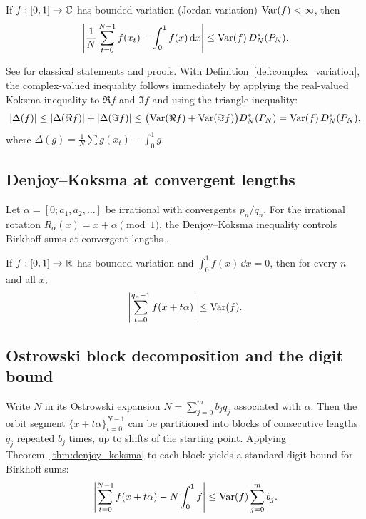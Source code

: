 \begin{theorem}
\label{thm:koksma_inequality_1d}
If $f:[0,1]\to\mathbb{C}$ has bounded variation (Jordan variation) $\mathrm{Var}(f)<\infty$, then
\begin{equation}
\left|\frac{1}{N}\sum_{t=0}^{N-1} f(x_t)-\int_0^1 f(x)\,\mathrm{d} x\right|
\le \mathrm{Var}(f)\,D_N^\ast(P_N).
\end{equation}
\end{theorem}
\begin{remark}
See \cite{Koksma1935,KuipersNiederreiter1974} for classical statements and proofs.
With Definition~\ref{def:complex_variation}, the complex-valued inequality follows immediately by applying the real-valued Koksma inequality to $\Re f$ and $\Im f$ and using the triangle inequality:
\begin{equation}
\left|\Delta(f)\right|
\le \left|\Delta(\Re f)\right|+\left|\Delta(\Im f)\right|
\le \big(\mathrm{Var}(\Re f)+\mathrm{Var}(\Im f)\big)D_N^\ast(P_N)
=\mathrm{Var}(f)\,D_N^\ast(P_N),
\end{equation}
where $\Delta(g)=\frac{1}{N}\sum g(x_t)-\int_0^1 g$.
\end{remark}

\subsection{Denjoy--Koksma at convergent lengths}
\label{app:denjoy_koksma}

Let $\alpha=[0;a_1,a_2,\dots]$ be irrational with convergents $p_n/q_n$. For the irrational rotation $R_\alpha(x)=x+\alpha\pmod 1$, the Denjoy--Koksma inequality controls Birkhoff sums at convergent lengths \cite{Denjoy1932,Koksma1935,KatokHasselblatt1995}.

\begin{theorem}
\label{thm:denjoy_koksma}
If $f:[0,1]\to\mathbb{R}$ has bounded variation and $\int_0^1 f(x)\,\dd x=0$, then for every $n$ and all $x$,
\begin{equation}
\left|\sum_{t=0}^{q_n-1} f(x+t\alpha)\right|\le \mathrm{Var}(f).
\end{equation}
\end{theorem}

\subsection{Ostrowski block decomposition and the digit bound}
\label{app:dk_koksma_ostrowski}

Write $N$ in its Ostrowski expansion $N=\sum_{j=0}^m b_j q_j$ associated with $\alpha$. Then the orbit segment $\{x+t\alpha\}_{t=0}^{N-1}$ can be partitioned into blocks of consecutive lengths $q_j$ repeated $b_j$ times, up to shifts of the starting point. Applying Theorem~\ref{thm:denjoy_koksma} to each block yields a standard digit bound for Birkhoff sums:
\begin{equation}
\left|\sum_{t=0}^{N-1} f(x+t\alpha) - N\int_0^1 f\right|
\le \mathrm{Var}(f)\sum_{j=0}^m b_j.
\end{equation}

